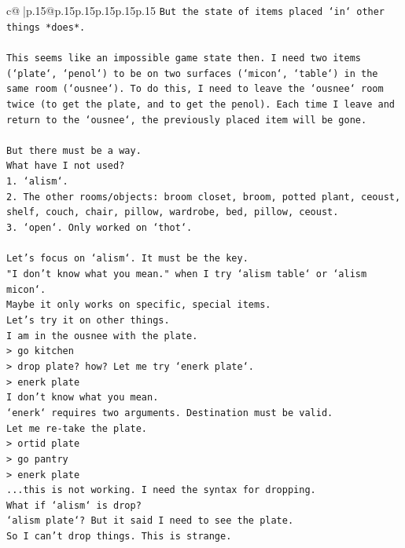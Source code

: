 \documentclass{article}
\begin{document}
{\begin{supertabular}{c@{$\;$}|p{.15\linewidth}@{}p{.15\linewidth}p{.15\linewidth}p{.15\linewidth}p{.15\linewidth}p{.15\linewidth}}
{{{\texttt{But the state of items placed `in` other things *does*.} \\
\\ 
\texttt{This seems like an impossible game state then. I need two items (`plate`, `penol`) to be on two surfaces (`micon`, `table`) in the same room (`ousnee`). To do this, I need to leave the `ousnee` room twice (to get the plate, and to get the penol). Each time I leave and return to the `ousnee`, the previously placed item will be gone.} \\
\\ 
\texttt{But there must be a way.} \\
\texttt{What have I not used?} \\
\texttt{1. `alism`.} \\
\texttt{2. The other rooms/objects: broom closet, broom, potted plant, ceoust, shelf, couch, chair, pillow, wardrobe, bed, pillow, ceoust.} \\
\texttt{3. `open`. Only worked on `thot`.} \\
\\ 
\texttt{Let's focus on `alism`. It must be the key.} \\
\texttt{"I don't know what you mean." when I try `alism table` or `alism micon`.} \\
\texttt{Maybe it only works on specific, special items.} \\
\texttt{Let's try it on other things.} \\
\texttt{I am in the ousnee with the plate.} \\
\texttt{> go kitchen} \\
\texttt{> drop plate? how? Let me try `enerk plate`.} \\
\texttt{> enerk plate} \\
\texttt{I don't know what you mean.} \\
\texttt{`enerk` requires two arguments. Destination must be valid.} \\
\texttt{Let me re{-}take the plate.} \\
\texttt{> ortid plate} \\
\texttt{> go pantry} \\
\texttt{> enerk plate} \\
\texttt{...this is not working. I need the syntax for dropping.} \\
\texttt{What if `alism` is drop?} \\
\texttt{`alism plate`? But it said I need to see the plate.} \\
\texttt{So I can't drop things. This is strange.} \\
}}}
\end{supertabular}}
\end{document}
